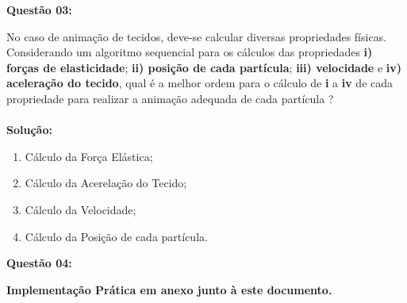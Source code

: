 \noindent\textbf{Questão 03:}

No caso de animação de tecidos, deve-se calcular diversas propriedades físicas. Considerando um algoritmo sequencial para os cálculos das propriedades \textbf{i) forças de elasticidade}; \textbf{ii) posição de cada partícula}; \textbf{iii) velocidade} e \textbf{iv) aceleração do tecido}, qual é a melhor ordem para o cálculo de \textbf{i} a \textbf{iv} de cada propriedade para realizar a animação adequada de cada partícula ?\\
\\
\noindent\textbf{Solução:}
\begin{enumerate}
    \item Cálculo da Força Elástica;
    \item Cálculo da Acerelação do Tecido;
    \item Cálculo da Velocidade;
    \item Cálculo da Posição de cada partícula.
\end{enumerate}
\vspace{0.5cm}

\noindent\textbf{Questão 04:}
\begin{center}
    \textbf{Implementação Prática em anexo junto à este documento.}
\end{center}

